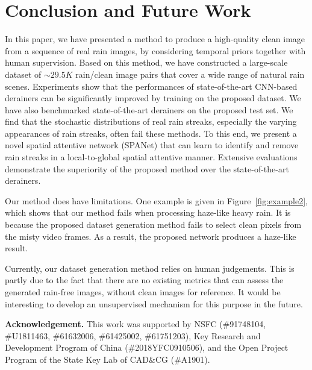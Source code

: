\documentclass[10pt,twocolumn,letterpaper]{article}
\begin{document}
\section{Conclusion and Future Work}
In this paper, we have presented a method to produce a high-quality clean image from a sequence of real rain images, by considering temporal priors together with human supervision. Based on this method, we have constructed a large-scale dataset of $\sim$$29.5K$ rain/clean image pairs that cover a wide range of natural rain scenes. Experiments show that the performances of state-of-the-art CNN-based derainers can be significantly improved by training on the proposed dataset. We have also benchmarked state-of-the-art derainers on the proposed test set. We find that the stochastic distributions of real rain streaks, especially the varying appearances of rain streaks, often fail these methods.
To this end, we present a novel spatial attentive network (SPANet) that can learn to identify and remove rain streaks in a local-to-global spatial attentive manner. Extensive evaluations demonstrate the superiority of the proposed method over the state-of-the-art derainers.

Our method does have limitations. One example is given in Figure~\ref{fig:example2}, which shows that our method fails when processing haze-like heavy rain. It is because the proposed dataset generation method fails to select clean pixels from the misty video frames. As a result, the proposed network produces a haze-like result.

Currently, our dataset generation method relies on human judgements. This is partly due to the fact that there are no existing metrics that can assess the generated rain-free images, without clean images for reference. It would be interesting to develop an unsupervised mechanism for this purpose in the future.


{\bf Acknowledgement.} This work was supported by NSFC (\#91748104, \#U1811463, \#61632006, \#61425002, \#61751203), Key Research and Development Program of China (\#2018YFC0910506), and the Open Project Program of the State Key Lab of CAD\&CG (\#A1901).

{\small


}
\end{document}
